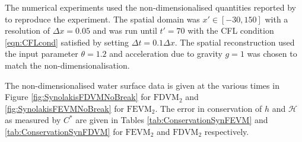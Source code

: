 The numerical experiments used the non-dimensionalised quantities reported by \citet{Synolakis-1987-523} to reproduce the experiment. The spatial domain was $x' \in [-30,150]$ with a resolution of $\Delta x = 0.05$ and was run until $t' = 70$ with the CFL condition \eqref{eqn:CFLcond} satisfied by setting $\Delta t = 0.1 \Delta x$. The spatial reconstruction used the input parameter $\theta = 1.2$ and acceleration due to gravity $g= 1$ was chosen to match the non-dimensionalisation.

The non-dimensionalised water surface data is given at the various times in Figure \ref{fig:SynolakisFDVMNoBreak} for $\text{FDVM}_2$ and \ref{fig:SynolakisFEVMNoBreak} for $\text{FEVM}_2$. The error in conservation of $h$ and $\mathcal{H}$ as measured by $C^*$ are given in Tables \ref{tab:ConservationSynFEVM} and \ref{tab:ConservationSynFDVM} for $\text{FEVM}_2$ and $\text{FDVM}_2$ respectively. 

